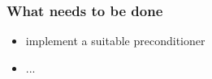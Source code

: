 \subsubsection*{What needs to be done}

\begin{itemize}
\item implement a suitable preconditioner
\item ...
\end{itemize}
